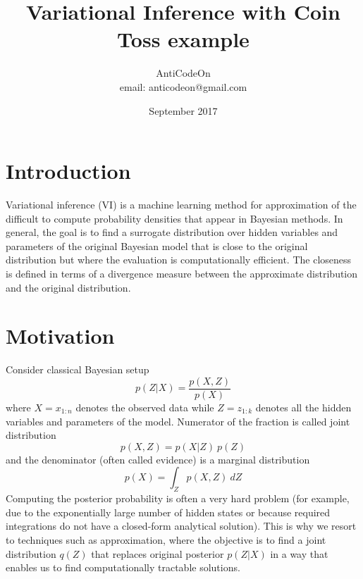 \documentclass{article}
\title{Variational Inference with Coin Toss example}
\author{AntiCodeOn \\ email: {anticodeon@gmail.com}  }
\date{September 2017}
\begin{document}
\maketitle

\section{Introduction}
Variational inference (VI) is a machine learning method for approximation of the difficult to compute probability densities that appear in Bayesian methods. In general, the goal is to find a surrogate distribution over hidden variables and parameters of the original Bayesian model that is close to the original distribution but where the evaluation is computationally efficient. The closeness is defined in terms of a divergence measure between the approximate distribution and the original distribution. 

\section{Motivation}
Consider classical Bayesian setup 
\begin{equation}\label{BayesEq}
p(Z|X) = \frac{p(X,Z)}{p(X)}
\end{equation}
where $X=x_{1:n}$ denotes the observed data while $Z=z_{1:k}$ denotes all the hidden variables and parameters of the model. Numerator of the fraction is called joint distribution
\begin{equation}
    p(X,Z) = p(X|Z)\:p(Z)
\end{equation}
and the denominator (often called evidence) is a marginal distribution
\begin{equation}
    p(X)=\int_{Z}p(X,Z)\:dZ
\end{equation}
Computing the posterior probability is often a very hard problem (for example, due to the exponentially large number of hidden states or because required integrations do not have a closed-form analytical solution). This is why we resort to techniques such as approximation, where the objective is to find a joint distribution $q(Z)$ that replaces original posterior $p(Z|X)$ in a way that enables us to find computationally tractable solutions.
\end{document}
